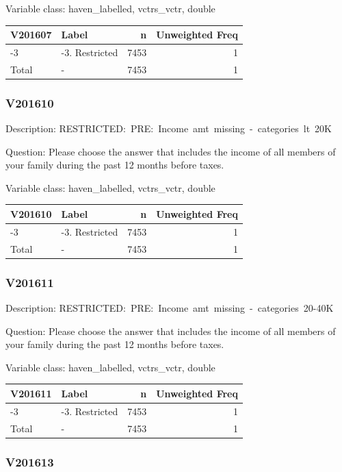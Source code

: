 \documentclass[
]{krantz}
\begin{document}
Variable class: haven\_labelled, vctrs\_vctr, double

\begin{tabular}[t]{l|l|r|r}
\hline
V201607 & Label & n & Unweighted Freq\\
\hline
-3 & -3. Restricted & 7453 & 1\\
\hline
Total & - & 7453 & 1\\
\hline
\end{tabular}

\hypertarget{v201610}{%
\subsubsection*{V201610}\label{v201610}}


Description: RESTRICTED:~PRE:~Income~amt~missing~-~categories~lt~20K

Question: Please choose the answer that includes the income of all members of your family during the past 12 months before taxes.

Variable class: haven\_labelled, vctrs\_vctr, double

\begin{tabular}[t]{l|l|r|r}
\hline
V201610 & Label & n & Unweighted Freq\\
\hline
-3 & -3. Restricted & 7453 & 1\\
\hline
Total & - & 7453 & 1\\
\hline
\end{tabular}

\hypertarget{v201611}{%
\subsubsection*{V201611}\label{v201611}}


Description: RESTRICTED:~PRE:~Income~amt~missing~-~categories~20-40K

Question: Please choose the answer that includes the income of all members of your family during the past 12 months before taxes.

Variable class: haven\_labelled, vctrs\_vctr, double

\begin{tabular}[t]{l|l|r|r}
\hline
V201611 & Label & n & Unweighted Freq\\
\hline
-3 & -3. Restricted & 7453 & 1\\
\hline
Total & - & 7453 & 1\\
\hline
\end{tabular}

\hypertarget{v201613}{%
\subsubsection*{V201613}\label{v201613}}
\end{document}
